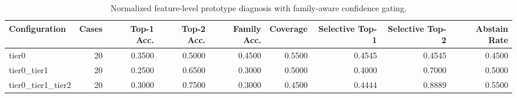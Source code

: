 \begin{table}[t]
\centering
\caption{Normalized feature-level prototype diagnosis with family-aware confidence gating.}
\label{tab:dice_stressor_hierarchical_diagnosis}
\footnotesize
\begin{tabular}{lrrrrrrrr}
\toprule
Configuration & Cases & Top-1 Acc. & Top-2 Acc. & Family Acc. & Coverage & Selective Top-1 & Selective Top-2 & Abstain Rate \\
\midrule
tier0 & 20 & 0.3500 & 0.5000 & 0.4500 & 0.5500 & 0.4545 & 0.4545 & 0.4500 \\
tier0_tier1 & 20 & 0.2500 & 0.6500 & 0.3000 & 0.5000 & 0.4000 & 0.7000 & 0.5000 \\
tier0_tier1_tier2 & 20 & 0.3000 & 0.7500 & 0.3000 & 0.4500 & 0.4444 & 0.8889 & 0.5500 \\
\bottomrule
\end{tabular}

\end{table}
